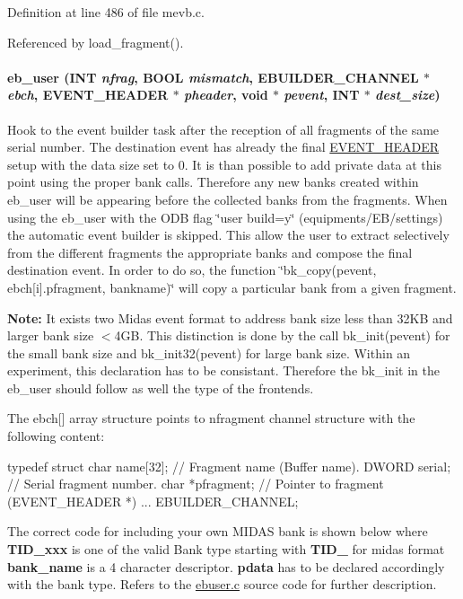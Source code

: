 Definition at line 486 of file mevb.c.

Referenced by load\_\-fragment().
\paragraph[{eb\_\-user}]{ eb\_\-user ({\bf INT} {\em nfrag}, \/  {\bf BOOL} {\em mismatch}, \/  EBUILDER\_\-CHANNEL $\ast$ {\em ebch}, \/  {\bf EVENT\_\-HEADER} $\ast$ {\em pheader}, \/  void $\ast$ {\em pevent}, \/  {\bf INT} $\ast$ {\em dest\_\-size})}\hfill\label{mevb_8c_a9f20cb62a85e635ba6b858b380cf1b49}
Hook to the event builder task after the reception of all fragments of the same serial number. The destination event has already the final \hyperlink{structEVENT__HEADER}{EVENT\_\-HEADER} setup with the data size set to 0. It is than possible to add private data at this point using the proper bank calls. Therefore any new banks created within eb\_\-user will be appearing before the collected banks from the fragments. When using the eb\_\-user with the ODB flag \char`\"{}user build=y\char`\"{} (equipments/EB/settings) the automatic event builder is skipped. This allow the user to extract selectively from the different fragments the appropriate banks and compose the final destination event. In order to do so, the function \char`\"{}bk\_\-copy(pevent, ebch\mbox{[}i\mbox{]}.pfragment, bankname)\char`\"{} will copy a particular bank from a given fragment.

{\bfseries Note:} It exists two Midas event format to address bank size less than 32KB and larger bank size $<$4GB. This distinction is done by the call bk\_\-init(pevent) for the small bank size and bk\_\-init32(pevent) for large bank size. Within an experiment, this declaration has to be consistant. Therefore the bk\_\-init in the eb\_\-user should follow as well the type of the frontends.

The ebch\mbox{[}\mbox{]} array structure points to nfragment channel structure with the following content: 
\begin{DoxyCode}
typedef struct {
    char  name[32];         // Fragment name (Buffer name).
    DWORD serial;           // Serial fragment number.
    char *pfragment;        // Pointer to fragment (EVENT_HEADER *)
    ...
} EBUILDER_CHANNEL;
\end{DoxyCode}


The correct code for including your own MIDAS bank is shown below where {\bfseries TID\_\-xxx} is one of the valid Bank type starting with {\bfseries TID\_\-} for midas format {\bfseries bank\_\-name} is a 4 character descriptor. {\bfseries pdata} has to be declared accordingly with the bank type. Refers to the \hyperlink{ebuser_8c}{ebuser.c} source code for further description.

